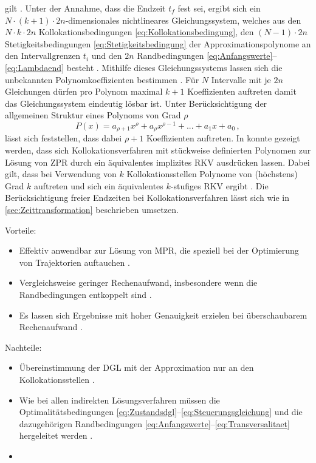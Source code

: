 gilt \cite{Papageorgiou.2012}. Unter der Annahme, dass die Endzeit $t_f$ fest sei, ergibt sich ein $N\cdot (k+1)\cdot 2n$-dimensionales nichtlineares Gleichungssystem, welches aus den $N\cdot k\cdot 2n$ Kollokationsbedingungen \eqref{eq:Kollokationsbedingung}, den $(N-1)\cdot 2n$ Stetigkeitsbedingungen \eqref{eq:Stetigkeitsbedingung} der Approximationspolynome an den Intervallgrenzen $t_i$ und den $2n$ Randbedingungen \eqref{eq:Anfangswerte}--\eqref{eq:Lambdaend} besteht \cite{Gerdts.2010}. Mithilfe dieses Gleichungssystems lassen sich die unbekannten Polynomkoeffizienten bestimmen \cite{Gerdts.2010}. Für $N$ Intervalle mit je $2n$ Gleichungen dürfen pro Polynom maximal $k+1$ Koeffizienten auftreten damit das Gleichungssystem eindeutig lösbar ist. Unter Berücksichtigung der allgemeinen Struktur eines Polynoms von Grad $\rho$
\begin{equation}
	P(x) = a_{\rho+1}x^\rho + a_{\rho}x^{\rho-1} + ... + a_{1}x + a_0\,,
\end{equation}
lässt sich feststellen, dass dabei $\rho+1$ Koeffizienten auftreten. In \cite{Ascher.1995c5} konnte gezeigt werden, dass sich Kollokationsverfahren mit stückweise definierten Polynomen zur Lösung von \gls{ZPR} durch ein äquivalentes implizites \gls{RKV} ausdrücken lassen. Dabei gilt, dass bei Verwendung von $k$ Kollokationsstellen Polynome von (höchstens) Grad $k$ auftreten und sich ein äquivalentes $k$-stufiges \gls{RKV} ergibt \cite{Ascher.1995c5}. Die Berücksichtigung freier Endzeiten bei Kollokationsverfahren lässt sich wie in \ref{sec:Zeittransformation} beschrieben umsetzen. 
\newpage
\begin{multicols}{2}
	Vorteile:
	\begin{itemize}
		\item Effektiv anwendbar zur Lösung von \gls{MPR}, die speziell bei der Optimierung von Trajektorien auftauchen \cite{Betts.1998}.
		\item Vergleichsweise geringer Rechenaufwand, insbesondere wenn die Randbedingungen entkoppelt sind \cite{Cash.1980}.
		\item Es lassen sich Ergebnisse mit hoher Genauigkeit erzielen bei überschaubarem Rechenaufwand \cite{Cash.1980}.
	\end{itemize}
	
	\columnbreak
	
	Nachteile:
	\begin{itemize}
		\item Übereinstimmung der \gls{DGL} mit der Approximation nur an den Kollokationsstellen \cite{Betts.1998}.	
		\item Wie bei allen indirekten Lösungsverfahren müssen die Optimalitätsbedingungen \eqref{eq:Zustandsdgl}--\eqref{eq:Steuerungsgleichung} und die dazugehörigen Randbedingungen \eqref{eq:Anfangswerte}--\eqref{eq:Transversalitaet} hergeleitet werden \cite{Betts.1998}.

		\item[\vspace{\fill}]
	\end{itemize}
\end{multicols}
